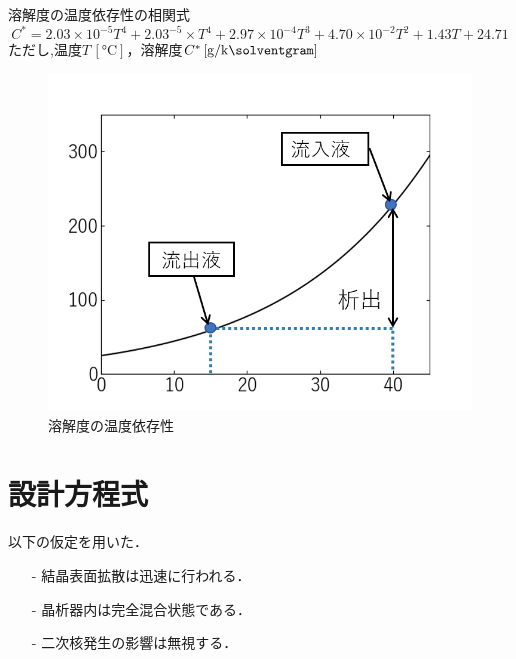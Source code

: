 \documentclass[a4j]{jsreport}
\begin{document}
\noindent 溶解度の温度依存性の相関式
\begin{equation}
    C^*=2.03\times 10^{-5}T^4 +2.03^{-5}\times T^4 + 2.97\times 10^{-4}T^3 + 4.70\times 10^{-2}T^2 + 1.43T + 24.71
\end{equation}
ただし,温度$T \, [\si{\degreeCelsius}]$，溶解度$C^* \, [\si{\gram \per \kilo \solventgram}]$
\begin{figure}[htbp]
  \centering
  \includegraphics[scale=0.7]{BzAsolvent.png}
  \caption{溶解度の温度依存性}
  \label{溶解度の温度依存性}
\end{figure}

\section{設計方程式}
以下の仮定を用いた．
\begin{itemize}
    \setlength{\parskip}{0pt}
    \setlength{\itemsep}{2pt}
    \item[-] 結晶表面拡散は迅速に行われる．
    \item[-] 晶析器内は完全混合状態である．
    \item[-] 二次核発生の影響は無視する．
\end{itemize}
\end{document}
